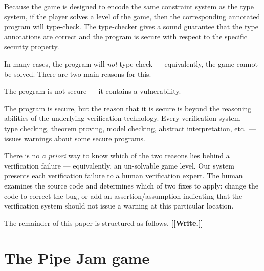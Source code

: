 \documentclass{sig-alternate}
\newcommand{\todo}[1]{{\color{red}\bfseries [[#1]]}}
\let\Enumerate =\enumerate
\def\Nospacing{\itemsep=0pt\topsep=0pt\partopsep=0pt\parskip=0pt\parsep=0pt}
\renewenvironment{enumerate}{\Enumerate\Nospacing}{\endlist}
\begin{document}
Because the game is designed to encode the same constraint system as
the type system, if the player solves a level of the game, then the
corresponding annotated program will type-check.  The type-checker
gives a sound guarantee that the type annotations are correct and the
program is secure with respect to the specific security property.

In many cases, the program will \emph{not} type-check ---
equivalently, the game cannot be solved.  There are two main reasons
for this.

\begin{enumerate}
\item
  The program is not secure --- it contains a vulnerability.
\item
  The program is secure, but the reason that it is secure is beyond
  the reasoning abilities of the underlying verification technology.
  Every verification system --- type checking, theorem proving, model
  checking, abstract interpretation, etc.\ --- issues warnings about
  some secure programs.
\end{enumerate}

\noindent
There is no \emph{a priori} way to know which of the two reasons lies
behind a verification failure --- equivalently, an un-solvable game
level.  Our system presents each verification failure to a human
verification expert.  The human examines the source code and
determines which of two fixes to apply: change the code to correct the
bug, or add an assertion/assumption indicating that the verification
system should not issue a warning at this particular location.

\medskip

The remainder of this paper is structured as follows.
\todo{Write.}




\section{The Pipe Jam game}
\label{sec:pipejam}
\end{document}
